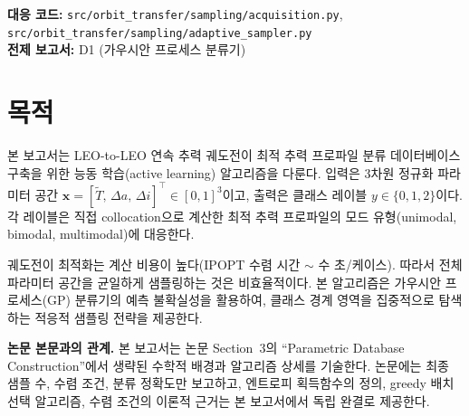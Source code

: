\documentclass[11pt]{article}
\begin{document}
\drawborder
\thispagestyle{firstpage}

\def\lighterdate{February 12, 2026}

\begin{abstract}
본 보고서는 LEO-to-LEO 연속 추력 궤도전이 최적 추력 프로파일 분류 데이터베이스 구축을 위한 능동 학습(active learning) 알고리즘을 다룬다. 입력은 3차원 정규화 파라미터 공간 $\mathbf{x} = [\tilde{T},\, \Delta a,\, \Delta i]^\top \in [0,1]^3$이고, 출력은 클래스 레이블 $y \in \{0, 1, 2\}$이다. 가우시안 프로세스(GP) 분류기의 예측 엔트로피를 획득함수로 사용하여, 클래스 경계 영역을 집중적으로 탐색하는 적응적 샘플링 전략을 제공한다. Greedy 배치 선택 알고리즘, 엔트로피 기반 수렴 조건, 경계 안정성 판정 기준의 수학적 배경과 구현 상세를 기술한다.
\end{abstract}

\vspace{0.3cm}
\noindent\textbf{대응 코드:} \texttt{src/orbit\_transfer/sampling/acquisition.py}, \texttt{src/orbit\_transfer/sampling/adaptive\_sampler.py}\\
\noindent\textbf{전제 보고서:} D1 (가우시안 프로세스 분류기)


\section{목적}

본 보고서는 LEO-to-LEO 연속 추력 궤도전이 최적 추력 프로파일 분류 데이터베이스 구축을 위한 능동 학습(active learning) 알고리즘을 다룬다. 입력은 3차원 정규화 파라미터 공간 $\mathbf{x} = [\tilde{T},\, \Delta a,\, \Delta i]^\top \in [0,1]^3$이고, 출력은 클래스 레이블 $y \in \{0, 1, 2\}$이다. 각 레이블은 직접 collocation으로 계산한 최적 추력 프로파일의 모드 유형(unimodal, bimodal, multimodal)에 대응한다.

궤도전이 최적화는 계산 비용이 높다(IPOPT 수렴 시간 $\sim$ 수 초/케이스). 따라서 전체 파라미터 공간을 균일하게 샘플링하는 것은 비효율적이다. 본 알고리즘은 가우시안 프로세스(GP) 분류기의 예측 불확실성을 활용하여, 클래스 경계 영역을 집중적으로 탐색하는 적응적 샘플링 전략을 제공한다.

\textbf{논문 본문과의 관계.} 본 보고서는 논문 Section~3의 ``Parametric Database Construction''에서 생략된 수학적 배경과 알고리즘 상세를 기술한다. 논문에는 최종 샘플 수, 수렴 조건, 분류 정확도만 보고하고, 엔트로피 획득함수의 정의, greedy 배치 선택 알고리즘, 수렴 조건의 이론적 근거는 본 보고서에서 독립 완결로 제공한다.
\end{document}
